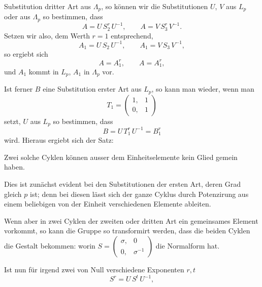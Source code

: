 Substitution dritter Art aus $\Lambda_p$, so können wir die Substitutionen
 $U$, $V$ aus $L_p$ oder aus $\Lambda_p$ so bestimmen, dass
\[
A = U\,S_2^r\,U^{-1}, \qquad A = V\,S_3^r\,V^{-1}.
\]
Setzen wir also, dem Werth $r=1$ entsprechend,
\[
A_1 = U\,S_2\,U^{-1}, \qquad A_1 = V\,S_3\,V^{-1},
\]
so ergiebt sich
\[
A = A_1^r, \qquad A = A_1^r,
\]
und $A_1$ kommt in $L_p$, $A_1$ in $\Lambda_p$ vor.

Ist ferner $B$ eine Substitution erster Art aus $L_p$, so kann
man wieder, wenn man
\[
T_1 = \begin{pmatrix} 1, & 1 \\ 0, & 1 \end{pmatrix}
\]
setzt, $U$ aus $L_p$ so bestimmen, dass
\[
B = U\,T_1^r\,U^{-1} = B_1^r
\]
wird. Hieraus ergiebt sich der Satz:


Zwei solche Cyklen können ausser dem Einheitselemente
kein Glied gemein haben.

Dies ist zunächst evident bei den Substitutionen der ersten
Art, deren Grad gleich $p$ ist; denn bei diesen lässt sich der
ganze Cyklus durch Potenzirung aus einem beliebigen von der
Einheit verschiedenen Elemente ableiten.

Wenn aber in zwei Cyklen der zweiten oder dritten Art ein
gemeinsames Element vorkommt, so kann die Gruppe so transformirt
 werden, dass die beiden Cyklen die Gestalt bekommen:
worin $S = \begin{pmatrix} \sigma, & 0 \\ 0, & \sigma^{-1} \end{pmatrix}$ die Normalform hat.

Ist nun für irgend zwei von Null verschiedene Exponenten
$r,t$
\[
S^r = U\,S^t\,U^{-1},
\]
